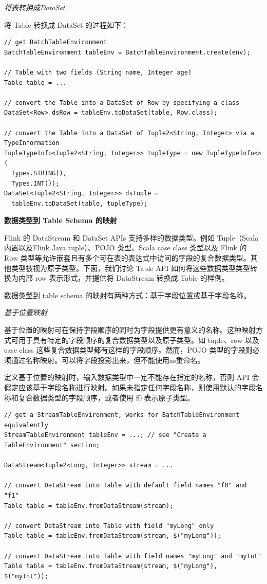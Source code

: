 \documentclass[cn,11pt,chinese]{elegantbook}
\begin{document}
\textit{将表转换成DataSet}

将 Table 转换成 DataSet 的过程如下：

\begin{verbatim}
// get BatchTableEnvironment
BatchTableEnvironment tableEnv = BatchTableEnvironment.create(env);

// Table with two fields (String name, Integer age)
Table table = ...

// convert the Table into a DataSet of Row by specifying a class
DataSet<Row> dsRow = tableEnv.toDataSet(table, Row.class);

// convert the Table into a DataSet of Tuple2<String, Integer> via a TypeInformation
TupleTypeInfo<Tuple2<String, Integer>> tupleType = new TupleTypeInfo<>(
  Types.STRING(),
  Types.INT());
DataSet<Tuple2<String, Integer>> dsTuple = 
  tableEnv.toDataSet(table, tupleType);
\end{verbatim}

\textbf{数据类型到 Table Schema 的映射}

Flink 的 DataStream 和 DataSet APIs 支持多样的数据类型。例如 Tuple（Scala 内置以及Flink Java tuple）、POJO 类型、Scala case class 类型以及 Flink 的 Row 类型等允许嵌套且有多个可在表的表达式中访问的字段的复合数据类型。其他类型被视为原子类型。下面，我们讨论 Table API 如何将这些数据类型类型转换为内部 row 表示形式，并提供将 DataStream 转换成 Table 的样例。

数据类型到 table schema 的映射有两种方式：基于字段位置或基于字段名称。

\textit{基于位置映射}

基于位置的映射可在保持字段顺序的同时为字段提供更有意义的名称。这种映射方式可用于具有特定的字段顺序的复合数据类型以及原子类型。如 tuple、row 以及 case class 这些复合数据类型都有这样的字段顺序。然而，POJO 类型的字段则必须通过名称映射。可以将字段投影出来，但不能使用as重命名。

定义基于位置的映射时，输入数据类型中一定不能存在指定的名称，否则 API 会假定应该基于字段名称进行映射。如果未指定任何字段名称，则使用默认的字段名称和复合数据类型的字段顺序，或者使用 f0 表示原子类型。

\begin{verbatim}
// get a StreamTableEnvironment, works for BatchTableEnvironment equivalently
StreamTableEnvironment tableEnv = ...; // see "Create a TableEnvironment" section;

DataStream<Tuple2<Long, Integer>> stream = ...

// convert DataStream into Table with default field names "f0" and "f1"
Table table = tableEnv.fromDataStream(stream);

// convert DataStream into Table with field "myLong" only
Table table = tableEnv.fromDataStream(stream, $("myLong"));

// convert DataStream into Table with field names "myLong" and "myInt"
Table table = tableEnv.fromDataStream(stream, $("myLong"), $("myInt"));
\end{verbatim}
\end{document}
